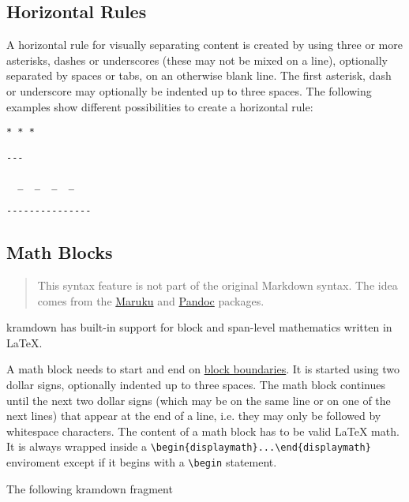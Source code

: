 \documentclass[a4paper]{article}
\begin{document}
\hypertarget{horizontal-rules}{\subsection{Horizontal
Rules}\label{horizontal-rules}}

A horizontal rule for visually separating content is created by using
three or more asterisks, dashes or underscores (these may not be mixed
on a line), optionally separated by spaces or tabs, on an otherwise
blank line. The first asterisk, dash or underscore may optionally be
indented up to three spaces. The following examples show different
possibilities to create a horizontal rule:

\begin{verbatim}
* * *

---

  _  _  _  _

---------------
\end{verbatim}

\hypertarget{math-blocks}{\subsection{Math Blocks}\label{math-blocks}}

\begin{quote}
This syntax feature is not part of the original Markdown syntax. The
idea comes from the \href{http://maruku.rubyforge.org}{Maruku} and
\href{http://johnmacfarlane.net/pandoc/}{Pandoc} packages.
\end{quote}

kramdown has built-in support for block and span-level mathematics
written in LaTeX.

A math block needs to start and end on
\protect\hyperlink{block-boundaries}{block boundaries}. It is started
using two dollar signs, optionally indented up to three spaces. The math
block continues until the next two dollar signs (which may be on the
same line or on one of the next lines) that appear at the end of a line,
i.e. they may only be followed by whitespace characters. The content of
a math block has to be valid LaTeX math. It is always wrapped inside a
\texttt{\textbackslash{}begin\{displaymath\}...\textbackslash{}end\{displaymath\}}
enviroment except if it begins with a \texttt{\textbackslash{}begin}
statement.

The following kramdown fragment
\end{document}
